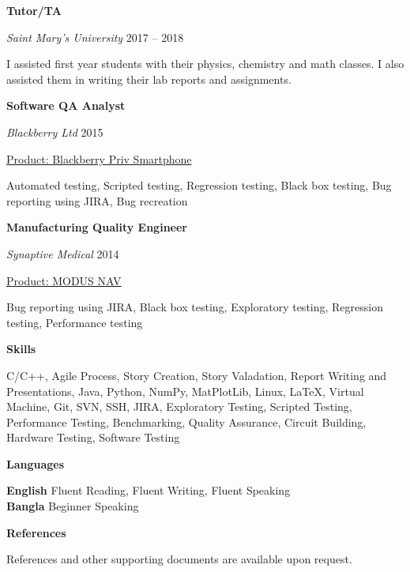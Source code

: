 \documentclass[12pt, twocolumn]{article}
\newcommand{\cvsection}[1] {
  \begin{center}
    \large\color{draculapurple}\textbf{#1}
  \end{center}
}
\begin{document}
\vspace{1em}
\textbf{\color{draculapurple}Tutor/TA}

\emph{Saint Mary's University} \hfill 2017 -- 2018

I assisted first year students with their physics, chemistry and math classes. I also assisted them in writing their lab reports and assignments.

\vspace{1em}
\textbf{\color{draculapurple}Software QA Analyst}

\emph{Blackberry Ltd} \hfill 2015

\underline{Product: Blackberry Priv Smartphone}

Automated testing,
Scripted testing,
Regression testing,
Black box testing,
Bug reporting using JIRA,
Bug recreation

\vspace{1em}
\textbf{\color{draculapurple}Manufacturing Quality Engineer}

\emph{Synaptive Medical} \hfill 2014

\underline{Product: MODUS NAV}

Bug reporting using JIRA,
Black box testing,
Exploratory testing,
Regression testing,
Performance testing


%

\cvsection{Skills}
C/C++,
Agile Process,
Story Creation,
Story Valadation,
Report Writing and Presentations,
Java,
Python,
NumPy,
MatPlotLib,
Linux,
\LaTeX,
Virtual Machine,
Git,
SVN,
SSH,
JIRA,
Exploratory Testing,
Scripted Testing,
Performance Testing,
Benchmarking,
Quality Assurance,
Circuit Building,
Hardware Testing,
Software Testing

\cvsection{Languages}
\textbf{English} Fluent Reading, Fluent Writing, Fluent Speaking\\
\textbf{Bangla} Beginner Speaking

\cvsection{References}
References and other supporting documents are available upon request.
\end{document}
